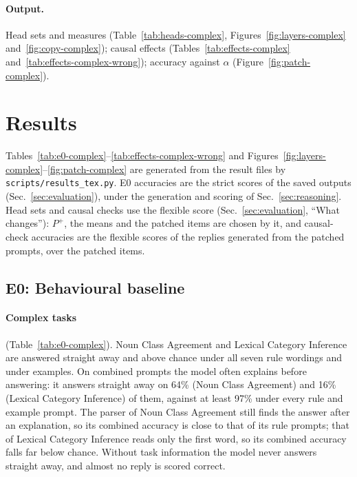 \documentclass[11pt,a4paper]{article}
\begin{document}
\paragraph{Output.} Head sets and measures (Table~\ref{tab:heads-complex}, Figures~\ref{fig:layers-complex} and~\ref{fig:copy-complex}); causal effects (Tables~\ref{tab:effects-complex} and~\ref{tab:effects-complex-wrong}); accuracy against $\alpha$ (Figure~\ref{fig:patch-complex}).

\section{Results}\label{sec:results}
Tables~\ref{tab:e0-complex}--\ref{tab:effects-complex-wrong} and Figures~\ref{fig:layers-complex}--\ref{fig:patch-complex} are generated from the result files by \texttt{scripts/results\_tex.py}. E0 accuracies are the strict scores of the saved outputs (Sec.~\ref{sec:evaluation}), under the generation and scoring of Sec.~\ref{sec:reasoning}. Head sets and causal checks use the flexible score (Sec.~\ref{sec:evaluation}, ``What changes''): $P^{+}$, the means and the patched items are chosen by it, and causal-check accuracies are the flexible scores of the replies generated from the patched prompts, over the patched items.

\subsection{E0: Behavioural baseline}\label{sec:res-e0}
\paragraph{Complex tasks} (Table~\ref{tab:e0-complex}). Noun Class Agreement and Lexical Category Inference are answered straight away and above chance under all seven rule wordings and under examples. On combined prompts the model often explains before answering: it answers straight away on 64\% (Noun Class Agreement) and 16\% (Lexical Category Inference) of them, against at least 97\% under every rule and example prompt. The parser of Noun Class Agreement still finds the answer after an explanation, so its combined accuracy is close to that of its rule prompts; that of Lexical Category Inference reads only the first word, so its combined accuracy falls far below chance. Without task information the model never answers straight away, and almost no reply is scored correct.
\end{document}
